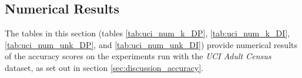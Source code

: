 \subsection{Numerical Results}\label{sec:app_num_results}
The tables in this section (tables \ref{tab:uci_num_k_DP}, \ref{tab:uci_num_k_DI}, \ref{tab:uci_num_unk_DP}, and \ref{tab:uci_num_unk_DI}) provide numerical results of the accuracy scores on the experiments run with the \textit{UCI Adult Census} dataset, as set out in section \ref{sec:discussion_accuracy}.
